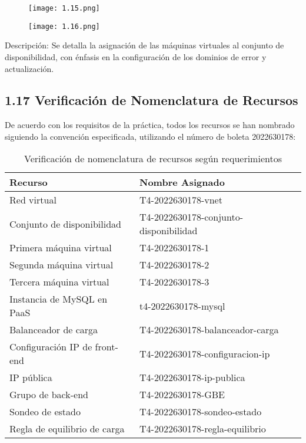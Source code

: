 \documentclass[12pt]{article}
\begin{document}
\begin{figure}[H]
    \centering
    \texttt{[image: 1.15.png]}
\end{figure}

\begin{figure}[H]
    \centering
    \texttt{[image: 1.16.png]}
\end{figure}

Descripción: Se detalla la asignación de las máquinas virtuales al conjunto de disponibilidad, con énfasis en la configuración de los dominios de error y actualización.

\subsection*{1.17 Verificación de Nomenclatura de Recursos}
De acuerdo con los requisitos de la práctica, todos los recursos se han nombrado siguiendo la convención especificada, utilizando el número de boleta 2022630178:

\begin{table}[H]
\centering
\begin{tabular}{|p{6cm}|p{8cm}|}
\hline
\textbf{Recurso} & \textbf{Nombre Asignado} \\
\hline
Red virtual & T4-2022630178-vnet \\
\hline
Conjunto de disponibilidad & T4-2022630178-conjunto-disponibilidad \\
\hline
Primera máquina virtual & T4-2022630178-1 \\
\hline
Segunda máquina virtual & T4-2022630178-2 \\
\hline
Tercera máquina virtual & T4-2022630178-3 \\
\hline
Instancia de MySQL en PaaS & t4-2022630178-mysql \\
\hline
Balanceador de carga & T4-2022630178-balanceador-carga \\
\hline
Configuración IP de front-end & T4-2022630178-configuracion-ip \\
\hline
IP pública & T4-2022630178-ip-publica \\
\hline
Grupo de back-end & T4-2022630178-GBE \\
\hline
Sondeo de estado & T4-2022630178-sondeo-estado \\
\hline
Regla de equilibrio de carga & T4-2022630178-regla-equilibrio \\
\hline
\end{tabular}
\caption{Verificación de nomenclatura de recursos según requerimientos}
\end{table}
\end{document}
